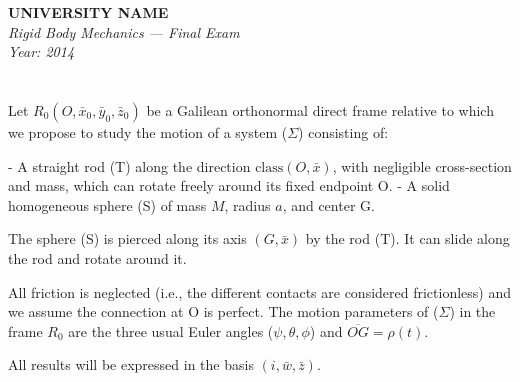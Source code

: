 \documentclass[12pt]{article}
\begin{document}
\begin{center}
  \Large\textbf{UNIVERSITY NAME} \\[1em]
  \large\textit{Rigid Body Mechanics — Final Exam} \\[0.5em]
  \large\textit{Year: 2014} \\[2em]
\end{center}

\vspace{0.5cm}

\section{}
Let \( R_0 (O, \bar{x}_0, \bar{y}_0, \bar{z}_0) \) be a Galilean orthonormal direct frame relative to which we propose to study the motion of a system (\(\Sigma\)) consisting of:

- A straight rod (T) along the direction \(\text{class}(O, \bar{x})\), with negligible cross-section and mass, which can rotate freely around its fixed endpoint O.
- A solid homogeneous sphere (S) of mass \(M\), radius \(a\), and center G.

The sphere (S) is pierced along its axis \((G, \bar{x})\) by the rod (T). It can slide along the rod and rotate around it.

All friction is neglected (i.e., the different contacts are considered frictionless) and we assume the connection at O is perfect.  
The motion parameters of (\(\Sigma\)) in the frame \(R_0\) are the three usual Euler angles (\(\psi, \theta, \phi\)) and \(\overline{OG} = \rho(t)\).

All results will be expressed in the basis \((i, \bar{w}, \bar{z})\).
\end{document}
